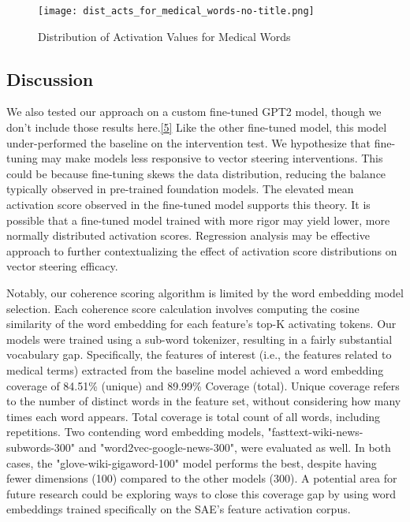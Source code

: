 \begin{figure}[htbp]
    \vspace{-1em} %
    \centering
    \texttt{[image: dist\_acts\_for\_medical\_words-no-title.png]}
    \vspace{-1em} %
    \caption{Distribution of Activation Values for Medical Words}
\end{figure}


\subsection{Discussion}

We also tested our approach on a custom fine-tuned GPT2 model, though we don't include those results here.\hyperlink{old-finetuned-results}{[5]} Like the other fine-tuned model, this model under-performed the baseline on the intervention test. We hypothesize that fine-tuning may make models less responsive to vector steering interventions. This could be because fine-tuning skews the data distribution, reducing the balance typically observed in pre-trained foundation models. The elevated mean activation score observed in the fine-tuned model supports this theory. It is possible that a fine-tuned model trained with more rigor may yield lower, more normally distributed activation scores. Regression analysis may be effective approach to further contextualizing the effect of activation score distributions on vector steering efficacy.

Notably, our coherence scoring algorithm is limited by the word embedding model selection. Each coherence score calculation involves computing the cosine similarity of the word embedding for each feature's top-K activating tokens. Our models were trained using a sub-word tokenizer, resulting in a fairly substantial vocabulary gap. Specifically, the features of interest (i.e., the features related to medical terms) extracted from the baseline model achieved a word embedding coverage of 84.51\% (unique) and 89.99\% Coverage (total). Unique coverage refers to the number of distinct words in the feature set, without considering how many times each word appears. Total coverage is total count of all words, including repetitions. Two contending word embedding models, "fasttext-wiki-news-subwords-300" and "word2vec-google-news-300", were evaluated as well. In both cases, the "glove-wiki-gigaword-100" model performs the best, despite having fewer dimensions (100) compared to the other models (300). A potential area for future research could be exploring ways to close this coverage gap by using word embeddings trained specifically on the SAE's feature activation corpus.
